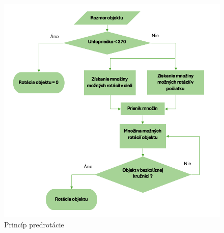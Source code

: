 \begin{figure}[h]
	\centering
	\includegraphics[width=140mm]{img/VD_predrot.png}
	\caption{ Princíp predrotácie} \label{OBRAZOK 4.15} 
\end{figure} 

